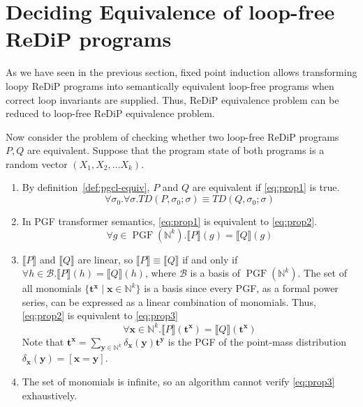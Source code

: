 \documentclass[a4paper]{article}
\DeclareMathOperator*{\PGF}{PGF}
\renewcommand{\S}[1]{ \llbracket #1 \rrbracket }
\begin{document}
\section{Deciding Equivalence of loop-free ReDiP programs}

As we have seen in the previous section, fixed point induction allows transforming loopy ReDiP programs into semantically equivalent loop-free programs when correct loop invariants are supplied.
Thus, ReDiP equivalence problem can be reduced to loop-free ReDiP equivalence problem.\par
Now consider the problem of checking whether two loop-free ReDiP programs \(P,Q\) are equivalent.
Suppose that the program state of both programs is a random vector \((X_1,X_2,\ldots X_k)\).
\begin{enumerate}
	\item By definition~\ref{def:pgcl-equiv}, \(P\) and \(Q\) are equivalent if \eqref{eq:prop1} is true.
	      \begin{equation}
		      \forall \sigma_0 . \forall \sigma . TD(P,\sigma_0; \sigma)\equiv TD(Q,\sigma_0;\sigma)\label{eq:prop1}
	      \end{equation}
	\item In PGF transformer semantics, \eqref{eq:prop1} is equivalent to \eqref{eq:prop2}.
	      \begin{equation}
		      \forall g\in \PGF(\mathbb{N}^k) . \S{P}(g) = \S{Q}(g)\label{eq:prop2}
	      \end{equation}
	\item \(\S{P}\) and \(\S{Q}\) are linear, so \(\S{P}\equiv\S{Q}\) if and only if \(\forall h\in \mathcal{B} . \S{P}(h)=\S{Q}(h)\), where \(\mathcal{B}\) is a basis of \(\PGF(\mathbb{N}^k)\).
	      The set of all monomials \(\{\mathbf{t}^\mathbf{x} \mid \mathbf{x} \in \mathbb{N}^k\}\) is a basis since every PGF, as a formal power series, can be expressed as a linear combination of monomials.
	      Thus, \eqref{eq:prop2} is equivalent to \eqref{eq:prop3}
	      \begin{equation}
		      \forall \mathbf{x} \in \mathbb{N}^k . \S{P}(\mathbf{t}^{\mathbf{x}}) = \S{Q}(\mathbf{t}^{\mathbf{x}}) \label{eq:prop3}
	      \end{equation}
	      Note that \(\mathbf{t}^{\mathbf{x}} = \sum_{\mathbf{y}\in\mathbb{N}^k} \delta_{\mathbf{x}}(\mathbf{y}) \mathbf{t}^{\mathbf{y}}\) is the PGF of the point-mass distribution \(\delta_{\mathbf{x}}(\mathbf{y})=[\mathbf{x}=\mathbf{y}]\).
	\item The set of monomials is infinite, so an algorithm cannot verify \eqref{eq:prop3} exhaustively.

\end{enumerate}
\end{document}
